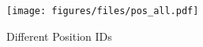 \begin{figure}[h]
    \centering
    \texttt{[image: figures/files/pos\_all.pdf]}
    \vspace{-3mm}
    \caption{Different Position IDs}
    \label{fig:pos_all}
\end{figure}